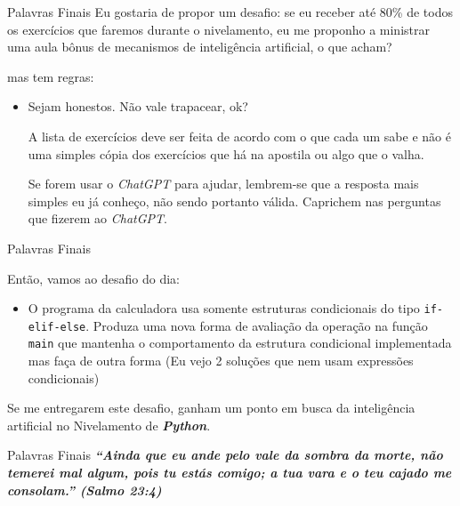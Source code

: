 \documentclass{beamer}
\begin{document}
\begin{frame}{Palavras Finais}
	\label{desafio}
	Eu gostaria de propor um desafio: se eu receber até 80\% de todos os exercícios que faremos durante o nivelamento, eu me proponho a ministrar uma aula bônus de mecanismos de inteligência artificial, o que acham?
	
	mas tem regras:
	
	\begin{itemize}
		\item Sejam honestos. Não vale trapacear, ok?
		
		\subitem A lista de exercícios deve ser feita de acordo com o que cada um sabe e não é uma simples cópia dos exercícios que há na apostila ou algo que o valha.
		
		\subitem Se forem usar o \textit{ChatGPT} para ajudar, lembrem-se que a resposta mais simples eu já conheço, não sendo portanto válida. Caprichem nas perguntas que fizerem ao \textit{ChatGPT}.
		
	\end{itemize}
	
\end{frame}

\begin{frame}{Palavras Finais}
	\label{desafio_2}

	Então, vamos ao desafio do dia:
	
	\begin{itemize}
		\item O programa da calculadora usa somente estruturas condicionais do tipo \texttt{if-elif-else}. Produza uma nova forma de avaliação da operação na função \texttt{main} que mantenha o comportamento da estrutura condicional implementada mas faça de outra forma (Eu vejo 2 soluções que nem usam expressões condicionais) 
	\end{itemize}
	
	Se me entregarem este desafio, ganham um ponto em busca da inteligência artificial no Nivelamento de \textbf{\textit{Python}}.
	
\end{frame}

\begin{frame}{Palavras Finais}
	\textit{\textbf{``Ainda que eu ande pelo vale da sombra da morte, não temerei mal algum, pois tu estás comigo; a tua vara e o teu cajado me consolam.'' (Salmo 23:4)}}
\end{frame}

\backmatter
\end{document}
